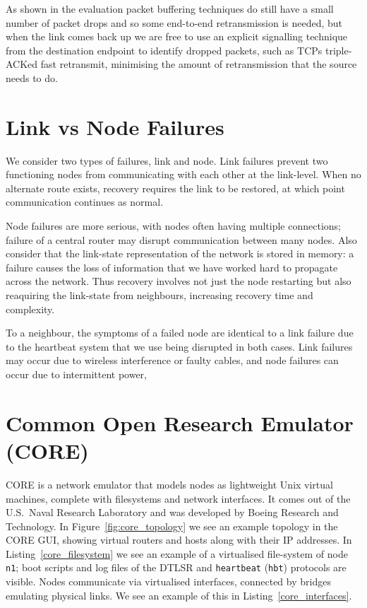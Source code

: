 \documentclass[withindex,glossary,openany]{cam-thesis}
\begin{document}
As shown in the evaluation packet buffering techniques do still have a small number of packet drops and so some end-to-end retransmission is needed, but when the link comes back up we are free to use an explicit signalling technique from the destination endpoint to identify dropped packets, such as TCPs triple-ACKed fast retransmit, minimising the amount of retransmission that the source needs to do.

\section{Link vs Node Failures}
\label{sec:link_vs_node_failures}

We consider two types of failures, link and node. Link failures prevent two functioning nodes from communicating with each other at the link-level. When no alternate route exists, recovery requires the link to be restored, at which point communication continues as normal.

Node failures are more serious, with nodes often having multiple connections; failure of a central router may disrupt communication between many nodes. Also consider that the link-state representation of the network is stored in memory: a failure causes the loss of information that we have worked hard to propagate across the network. Thus recovery involves not just the node restarting but also reaquiring the link-state from neighbours, increasing recovery time and complexity.

To a neighbour, the symptoms of a failed node are identical to a link failure due to the heartbeat system that we use being disrupted in both cases. Link failures may occur due to wireless interference or faulty cables, and node failures can occur due to intermittent power, 

\section{Common Open Research Emulator (CORE)}
\label{sec:core}

CORE \cite{CORE} is a network emulator that models nodes as lightweight Unix virtual machines, complete with filesystems and network interfaces. It comes out of the U.S.\ Naval Research Laboratory and was developed by Boeing Research and Technology. In Figure~\ref{fig:core_topology} we see an example topology in the CORE GUI, showing virtual routers and hosts along with their IP addresses. In Listing~\ref{core_filesystem} we see an example of a virtualised file-system of node \texttt{n1}; boot scripts and log files of the DTLSR and \texttt{heartbeat} (\texttt{hbt}) protocols are visible. Nodes communicate via virtualised interfaces, connected by bridges emulating physical links. We see an example of this in Listing~\ref{core_interfaces}.
\end{document}
